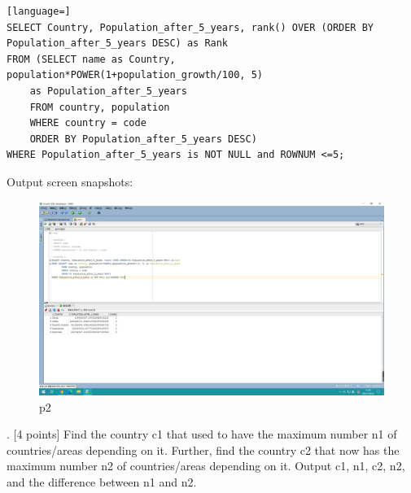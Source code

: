 \documentclass[]{article}
\begin{document}
	\begin{lstlisting}[language=] 
SELECT Country, Population_after_5_years, rank() OVER (ORDER BY Population_after_5_years DESC) as Rank
FROM (SELECT name as Country, population*POWER(1+population_growth/100, 5)
 	as Population_after_5_years
	FROM country, population
	WHERE country = code
	ORDER BY Population_after_5_years DESC)
WHERE Population_after_5_years is NOT NULL and ROWNUM <=5;
	\end{lstlisting} 
	Output screen snapshots:
	\begin{figure}[H]
		\centering
		\includegraphics[width=1\linewidth]{../screen/p2}
		\caption{p2}
		\label{fig:p2}
	\end{figure}
	
	. [4 points] Find the country c1 that used to have the maximum number n1 of countries/areas depending on it. Further, find the country c2 that now has the maximum number n2 of countries/areas depending on it. Output c1, n1, c2, n2, and the difference between n1 and n2.   \\
	
\end{document}
